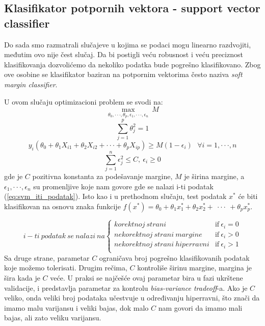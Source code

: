 \subsection{Klasifikator potpornih vektora - support vector classifier}
Do sada smo razmatrali slučajeve u kojima se podaci mogu linearno razdvojiti, međutim ovo nije čest slučaj.
Da bi postigli veću robusnost i veću preciznost klasifikovanja dozvolićemo da nekoliko podatka bude pogrešno klasifikovano.
Zbog ove osobine se klasifikator baziran na potpornim vektorima često naziva \textit{soft margin classifier}.

U ovom slučaju optimizacioni problem se svodi na:
\begin{equation} \label{eq:svm_op_max_m} \max\limits_{\theta_0, \cdot\cdot\cdot, \theta_p, \epsilon_1, \cdot\cdot\cdot, \epsilon_n} \ M \end{equation}
\begin{equation} \label{eq:svm_op_sum} \sum_{j=1}^{p}\theta_{j}^2=1 \end{equation}
\begin{equation} \label{eq:svm_op_constraint} y_i\left(\theta_0 + \theta_1X_{i1} + \theta_2X_{i2} + \cdot\cdot\cdot + \theta_pX_{ip}\right) \geq M\left(1-\epsilon_i\right) \ \ \ \forall i = 1, \cdot\cdot\cdot, n \end{equation}
\begin{equation} \label{eq:svm_op_epsilon} \sum_{j=1}^{n}\epsilon_{j}^2 \leq C, \ \epsilon_i \geq 0 \end{equation}
gde je $C$ pozitivna konstanta za podešavanje margine, $M$ je širina margine, a $\epsilon_1, \cdot\cdot\cdot, \epsilon_n$
su promenljive koje nam govore gde se nalazi i-ti podatak (\ref{eq:svm_iti_podatak}). Isto kao i u prethodnom slučaju, test podatak $x^*$ će biti klasifikovan na osnovu znaka funkcije
$f\left(x^*\right) = \theta_0 + \theta_1x^{*}_{1} + \theta_2x^{*}_{2} + \ \cdot\cdot\cdot \ + \theta_px^{*}_{p}.$

\begin{equation} \label{eq:svm_iti_podatak}
  i-ti \ podatak \ se \ nalazi \ na
    \begin{cases}
      korektnoj \ strani & \text{if}\ \epsilon_i = 0 \\
      nekorektnoj \ strani \ margine & \text{if}\ \epsilon_i > 0 \\
      nekorektnoj \ strani \ hiperravni & \text{if}\ \epsilon_i > 1 \\
    \end{cases}
\end{equation}
Sa druge strane, parametar $C$ ograničava broj pogrešno klasifikovanih podatak koje možemo tolerisati. Drugim rečima, $C$ kontroliše širinu margine,
margina je šira kada je $C$ veće. U praksi se najčešće ovaj parametar bira u fazi ukrštene validacije, i predstavlja parametar za kontrolu \textit{bias-variance tradeoff}-a.
Ako je $C$ veliko, onda veliki broj podataka učestvuje u određivanju hiperravni, što znači da imamo malu varijansu i veliki bajas, dok malo $C$ nam govori da imamo mali bajas, ali zato veliku varijansu.

